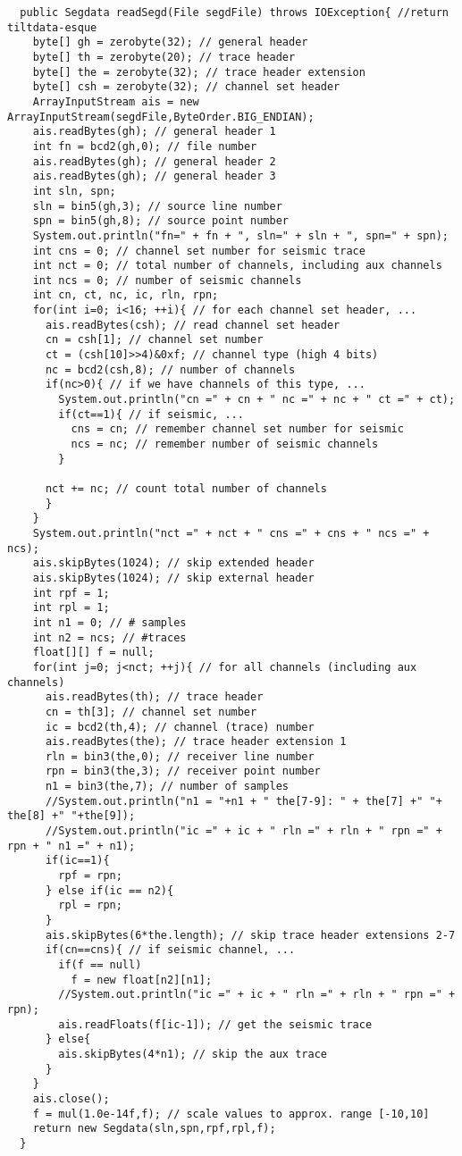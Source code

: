 \documentclass[11pt]{article}
\begin{document}
\begin{enumerate}
\begin{lstlisting}
  public Segdata readSegd(File segdFile) throws IOException{ //return tiltdata-esque
    byte[] gh = zerobyte(32); // general header
    byte[] th = zerobyte(20); // trace header
    byte[] the = zerobyte(32); // trace header extension
    byte[] csh = zerobyte(32); // channel set header
    ArrayInputStream ais = new ArrayInputStream(segdFile,ByteOrder.BIG_ENDIAN);
    ais.readBytes(gh); // general header 1
    int fn = bcd2(gh,0); // file number
    ais.readBytes(gh); // general header 2
    ais.readBytes(gh); // general header 3
    int sln, spn;
    sln = bin5(gh,3); // source line number
    spn = bin5(gh,8); // source point number
    System.out.println("fn=" + fn + ", sln=" + sln + ", spn=" + spn);
    int cns = 0; // channel set number for seismic trace
    int nct = 0; // total number of channels, including aux channels
    int ncs = 0; // number of seismic channels 
    int cn, ct, nc, ic, rln, rpn;
    for(int i=0; i<16; ++i){ // for each channel set header, ...
      ais.readBytes(csh); // read channel set header 
      cn = csh[1]; // channel set number
      ct = (csh[10]>>4)&0xf; // channel type (high 4 bits)
      nc = bcd2(csh,8); // number of channels
      if(nc>0){ // if we have channels of this type, ...
        System.out.println("cn =" + cn + " nc =" + nc + " ct =" + ct);
        if(ct==1){ // if seismic, ...
          cns = cn; // remember channel set number for seismic
          ncs = nc; // remember number of seismic channels
        }
       
      nct += nc; // count total number of channels
      }
    }
    System.out.println("nct =" + nct + " cns =" + cns + " ncs =" + ncs);
    ais.skipBytes(1024); // skip extended header
    ais.skipBytes(1024); // skip external header
    int rpf = 1;
    int rpl = 1;
    int n1 = 0; // # samples
    int n2 = ncs; // #traces 
    float[][] f = null; 
    for(int j=0; j<nct; ++j){ // for all channels (including aux channels)
      ais.readBytes(th); // trace header
      cn = th[3]; // channel set number
      ic = bcd2(th,4); // channel (trace) number
      ais.readBytes(the); // trace header extension 1
      rln = bin3(the,0); // receiver line number
      rpn = bin3(the,3); // receiver point number
      n1 = bin3(the,7); // number of samples
      //System.out.println("n1 = "+n1 + " the[7-9]: " + the[7] +" "+ the[8] +" "+the[9]); 
      //System.out.println("ic =" + ic + " rln =" + rln + " rpn =" + rpn + " n1 =" + n1);
      if(ic==1){
        rpf = rpn;
      } else if(ic == n2){
        rpl = rpn;
      }
      ais.skipBytes(6*the.length); // skip trace header extensions 2-7
      if(cn==cns){ // if seismic channel, ...
        if(f == null)
          f = new float[n2][n1];
        //System.out.println("ic =" + ic + " rln =" + rln + " rpn =" + rpn);
        ais.readFloats(f[ic-1]); // get the seismic trace
      } else{
        ais.skipBytes(4*n1); // skip the aux trace
      }
    }
    ais.close();
    f = mul(1.0e-14f,f); // scale values to approx. range [-10,10]
    return new Segdata(sln,spn,rpf,rpl,f);
  }


\end{lstlisting}
\end{enumerate}
\end{document}
